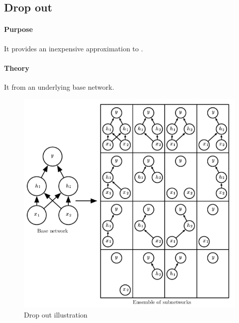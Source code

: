 \subsection{Drop out}
\paragraph{Purpose}
It provides an inexpensive approximation to .

\paragraph{Theory}
It  from an underlying base network.
\begin{figure}[H]
    \begin{center}
        \includegraphics[width=.5\textwidth]{chapters/4_deep_learning/2_regularization/images/01_droupout.png}
    \end{center}
    \caption{Drop out illustration}
    \label{fig:01_droupout.png}
\end{figure}

